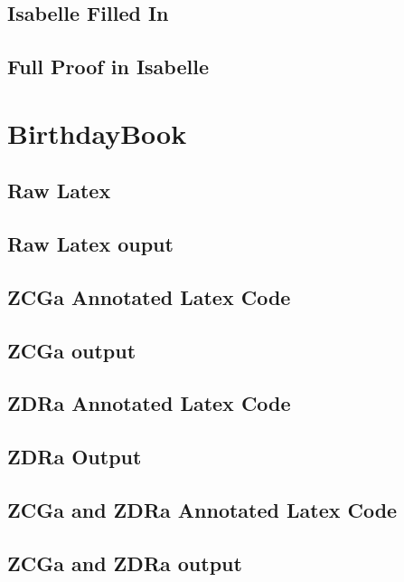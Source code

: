 \subsection{Isabelle Filled In}
\label{app:vm5}

\subsection{Full Proof in Isabelle}
\label{app:vm6}


\section{BirthdayBook}
\label{app:bb}

\subsection{Raw Latex}
\label{app:bb0}

\subsection{Raw Latex ouput}
\label{app:bb0o}

\subsection{ZCGa Annotated Latex Code}
\label{app:bb1}

\subsection{ZCGa output}
\label{app:bb1o}

\subsection{ZDRa Annotated Latex Code}
\label{app:bb2}

\subsection{ZDRa Output}
\label{app:bb2o}

\subsection{ZCGa and ZDRa Annotated Latex Code}
\label{app:bb1n2}

\subsection{ZCGa and ZDRa output}
\label{app:bb1n2o}


